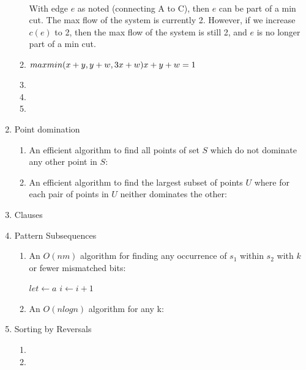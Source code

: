 \documentclass[a4paper]{article}
\begin{document}
\begin{enumerate}
\begin{enumerate}
\\
		With edge $e$ as noted (connecting A to C), then $e$ can be part of a min cut.  The max flow of the system is currently 2.  However, if we increase $c(e)$ to 2, then the max flow of the system is still 2, and $e$ is no longer part of a min cut.
	\item $max min(x+y,y+w,3x+w)\\x+y+w=1$
	\item 
	\item
	\item
	\end{enumerate}
\item Point domination
	\begin{enumerate}
	\item An efficient algorithm to find all points of set $S$ which do not dominate any other point in $S$:
	\item An efficient algorithm to find the largest subset of points $U$ where for each pair of points in $U$ neither dominates the other:
	\end{enumerate}
\item Clauses
\item Pattern Subsequences
	\begin{enumerate}
	\item An $O(nm)$ algorithm for finding any occurrence of $s_1$ within $s_2$ with $k$ or fewer mismatched bits:\\
		\begin{algorithmic}
				\State $let \gets a$
			\EndIf
			\State $i \gets i + 1$
		\EndFor
		\end{algorithmic}
	\item An $O(n log n)$ algorithm for any k:
	\end{enumerate}
\item Sorting by Reversals
	\begin{enumerate}
	\item
	\item
	\end{enumerate}
\end{enumerate}
\end{document}
